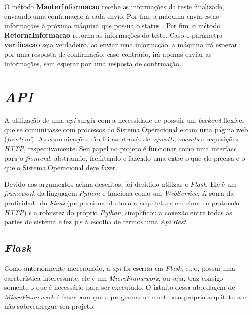 O método \textbf{ManterInformacao} recebe as informações do teste finalizado, enviando uma confirmação à cada envio. Por fim, a máquina envia estas informações à próxima máquina que possua o status 
. Por fim, o método \textbf{RetornaInformacao} retorna as informações do teste. Caso o parâmetro \textbf{verificacao} seja verdadeiro, ao enviar uma informação, a máquina irá esperar por uma resposta 
de confirmação; caso contrário, irá apenas enviar as informações, sem esperar por uma resposta de confirmação.




\section{\textit{API}}
\label{sec:api}

A utilização de uma \textit{api} surgiu com a necessidade de possuir um \textit{backend} flexível que se comunicasse com processos do Sistema Operacional e com uma página web (\textit{frontend}). As comunicações são feitas através de \textit{syscalls}, \textit{sockets} e requisições \textit{HTTP}, respectivamente. Seu papel no projeto é funcionar como uma interface para o \textit{frontend}, abstraindo, facilitando e fazendo uma  entre o que ele precisa e o que o Sistema Operacional deve fazer.

Devido aos argumentos acima descritos, foi decidido utilizar o \textit{Flask}. Ele é um \textit{framework} da linguagem \textit{Python} e funciona como um \textit{WebService}. 
A soma da praticidade do \textit{Flask} (proporcionando toda a arquitetura em cima do protocolo \textit{HTTP}) e a robustez do próprio \textit{Python}, simplificou a conexão entre todas as partes do sistema e fez jus à escolha de termos uma \textit{Api Rest}.

\subsection{\textit{Flask}}
\label{sec:flask}

Como anteriormente mencionado, a \textit{api} foi escrita em \textit{Flask}, cujo, possui uma caraterística interessante, ele é um \textit{MicroFramework}, ou seja, traz consigo somente o que é necessário para ser executado. O intuito dessa abordagem de \textit{MicroFramework} é fazer com que o programador monte sua própria arquitetura e não sobrecarregue seu projeto. 

